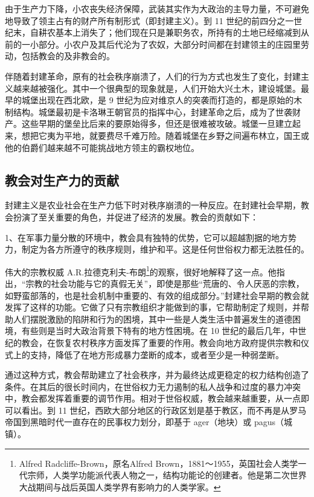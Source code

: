 由于生产力下降，小农丧失经济保障，武装其实作为大政治的主导力量，不可避免地导致了领主占有的财产所有制形式（即封建主义）。到 11 世纪的前四分之一世纪末，自耕农基本上消失了；他们现在只是兼职务农，所持有的土地已经缩减到从前的一小部分。小农户及其后代沦为了农奴，大部分时间都在封建领主的庄园里劳动，包括教会的及非教会的。

伴随着封建革命，原有的社会秩序崩溃了，人们的行为方式也发生了变化，封建主义越来越被强化。其中一个很典型的现象就是，人们开始大兴土木，建设城堡。最早的城堡出现在西北欧，是 9 世纪为应对维京人的突袭而打造的，都是原始的木制结构。城堡最初是卡洛琳王朝官员的指挥中心，封建革命之后，成为了世袭财产。这些早期的堡垒比后来的要原始得多，但还是很难被攻破。城堡一旦建立起来，想把它夷为平地，就要费尽千难万险。随着城堡在乡野之间遍布林立，国王或他的伯爵们越来越不可能挑战地方领主的霸权地位。

\subsection{教会对生产力的贡献}
封建主义是农业社会在生产力低下时对秩序崩溃的一种反应。在封建社会早期，教会扮演了至关重要的角色，并促进了经济的发展。教会的贡献如下：

1、在军事力量分散的环境中，教会具有独特的优势，它可以超越割据的地方势力，制定为各方所遵守的秩序规则，维护和平。这是任何世俗权力都无法胜任的。

伟大的宗教权威 A.R.拉德克利夫-布朗\footnote{Alfred Radcliffe-Brown，原名Alfred Brown，1881～1955，英国社会人类学一代宗师，人类学功能派代表人物之一，结构功能论的创建者。他是第二次世界大战期间与战后英国人类学界有影响力的人类学家。}的观察，很好地解释了这一点。他指出，“宗教的社会功能与它的真假无关”，即使是那些“荒唐的、令人厌恶的宗教，如野蛮部落的，也是社会机制中重要的、有效的组成部分。”封建社会早期的教会就发挥了这样的功能。它做了只有宗教组织才能做到的事，它帮助制定了规则，并帮助人们摆脱激励的陷阱和行为的困境，其中一些是人类生活中普遍发生的道德困境，有些则是当时大政治背景下特有的地方性困境。在 10 世纪的最后几年，中世纪的教会，在恢复农村秩序方面发挥了重要的作用。教会向地方政府提供宗教和仪式上的支持，降低了在地方形成暴力垄断的成本，或者至少是一种弱垄断。

通过这种方式，教会帮助建立了社会秩序，并为最终达成更稳定的权力结构创造了条件。在其后的很长时间内，在世俗权力无力遏制的私人战争和过度的暴力冲突中，教会都发挥着重要的调节作用。相对于世俗权威，教会越来越重要，从一点即可以看出。到 11 世纪，西欧大部分地区的行政区划是基于教区，而不再是从罗马帝国到黑暗时代一直存在的民事权力划分，即基于 ager（地块）或 pagus（城镇）。

